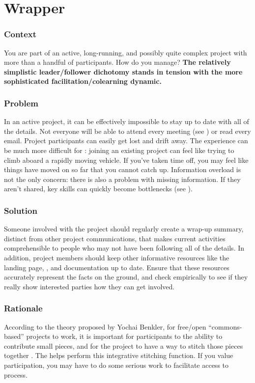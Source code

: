 
\section{Wrapper}\label{sec:Wrapper}

\subsubsection*{Context} You are part of an active, long-running, and possibly quite complex project with more than a handful of participants.  How do you manage?
\textbf{The relatively simplistic leader/follower dichotomy stands in tension with the more sophisticated facilitation/colearning dynamic.}

\subsubsection*{Problem} In an active project, it can be effectively impossible to stay up to date with all of the details.  Not everyone will be able to attend every meeting (see ) or read every email.  Project participants can easily get lost and drift away.  The experience can be much more difficult for : joining an existing project can feel like trying to climb aboard a rapidly moving vehicle.  If you've taken time off, you may feel like things have moved on so far that you cannot catch up.  Information overload is not the only concern: there is also a problem with missing information.  If they aren't shared, key skills can quickly become bottlenecks (see ).

\subsubsection*{Solution}
Someone involved with the project should regularly create a wrap-up summary, distinct from other project communications, that makes current activities comprehensible to people who may not have been following all of the details.  In addition, project members should keep other informative resources like the landing page, , and documentation up to date.  Ensure that these resources accurately represent the facts on the ground, and check empirically to see if they really show interested parties how they can get involved.

\subsubsection*{Rationale}
According to the theory proposed by Yochai Benkler, for free/open ``commons-based'' projects to work, it is important for participants to the ability to contribute small pieces, and for the project to have a way to stitch those pieces together \cite{coases-penguin}.  The  helps perform this integrative stitching function.  If you value participation, you may have to do some serious work to facilitate access to process.

